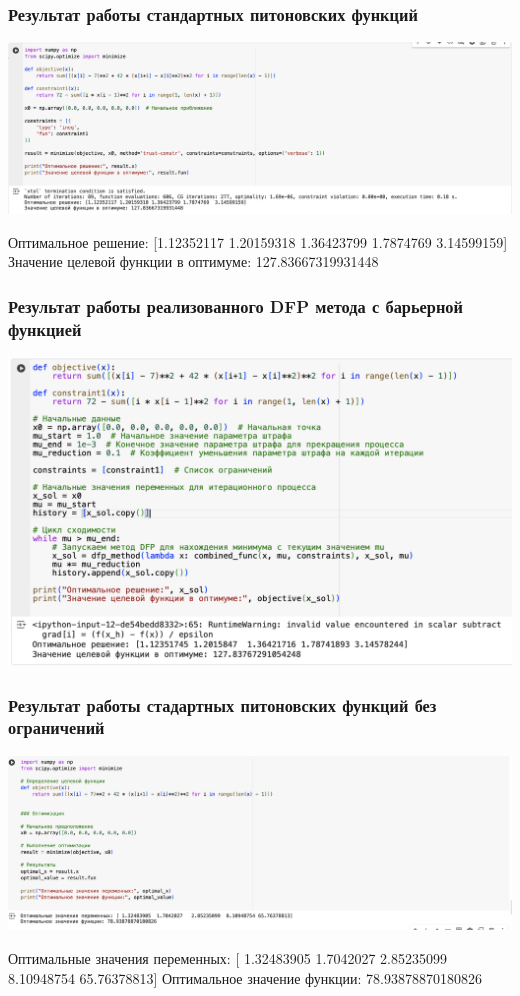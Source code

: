\documentclass[12pt,pdf,hyperref={unicode}]{beamer}
\begin{document}
\begin{frame}
\frametitle{Результат работы стандартных питоновских функций}
\begin{center}
    \includegraphics[width=1\textwidth]{python_optim_const.png}
\end{center}
Оптимальное решение: [1.12352117 1.20159318 1.36423799 1.7874769  3.14599159]
Значение целевой функции в оптимуме: 127.83667319931448
\end{frame}

\begin{frame}
\frametitle{Результат работы реализованного DFP метода с барьерной функцией}
\begin{center}
    \includegraphics[width=1\textwidth]{my_optim.png}
\end{center}
\end{frame}

\begin{frame}
\frametitle{Результат работы стадартных питоновских функций без ограничений}
\begin{center}
    \includegraphics[width=1\textwidth]{python_optim.png}
\end{center}
Оптимальные значения переменных: [ 1.32483905  1.7042027   2.85235099  8.10948754 65.76378813]
Оптимальное значение функции: 78.93878870180826
\end{frame}
\end{document}
